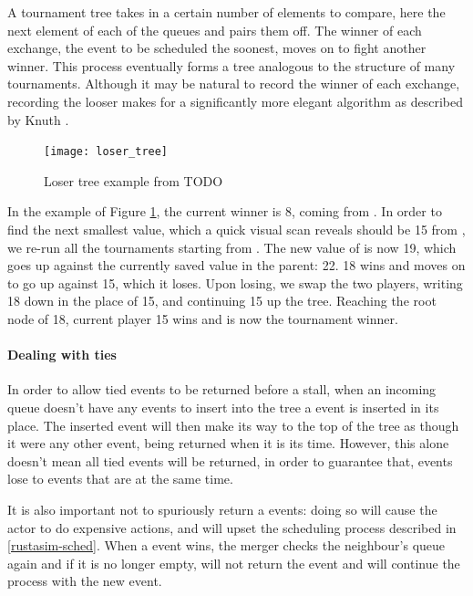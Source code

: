 A tournament tree takes in a certain number of elements to compare, here the next element of each of the queues and pairs them off.
The winner of each exchange, the event to be scheduled the soonest, moves on to fight another winner.
This process eventually forms a tree analogous to the structure of many tournaments.
Although it may be natural to record the winner of each exchange, recording the looser makes for a significantly more elegant algorithm as described by Knuth \cite{knuth_art_1998}.

\begin{figure}[h]
    \centering
    \texttt{[image: loser\_tree]}
    \caption{Loser tree example from TODO}
    \label{loser-tree:fig}
\end{figure}

In the example of Figure \ref{loser-tree:fig}, the current winner is 8, coming from .
In order to find the next smallest value, which a quick visual scan reveals should be 15 from , we re-run all the tournaments starting from .
The new value of  is now 19, which goes up against the currently saved value in the parent: 22.
18 wins and moves on to go up against 15, which it loses.
Upon losing, we swap the two players, writing 18 down in the place of 15, and continuing 15 up the tree.
Reaching the root node of 18, current player 15 wins and is now the tournament winner.


\paragraph{Dealing with ties}
In order to allow tied events to be returned before a stall, when an incoming queue doesn't have any events to insert into the tree a  event is inserted in its place.
The inserted event will then make its way to the top of the tree as though it were any other event, being returned when it is its time.
However, this alone doesn't mean all tied events will be returned, in order to guarantee that,  events lose to events that are at the same time.

It is also important not to spuriously return a  events: doing so will cause the actor to do expensive actions, and will upset the scheduling process described in \ref{rustasim-sched}.
When a  event wins, the merger checks the neighbour's queue again and if it is no longer empty, will not return the  event and will continue the process with the new event.


